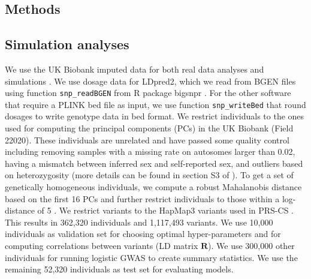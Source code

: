 \documentclass{bioinfo}
\begin{document}


\begin{methods}
\section{Methods}

\subsection*{Simulation analyses}

We use the UK Biobank imputed data for both real data analyses and simulations \cite[]{bycroft2018uk}. 
We use dosage data for LDpred2, which we read from BGEN files using function \texttt{snp\_readBGEN} from R package bigsnpr \cite[]{prive2017efficient}.
For the other software that require a PLINK bed file as input, we use function \texttt{snp\_writeBed} that round dosages to write genotype data in bed format.
We restrict individuals to the ones used for computing the principal components (PCs) in the UK Biobank (Field 22020). These individuals are unrelated and have passed some quality control including removing samples with a missing rate on autosomes larger than 0.02, having a mismatch between inferred sex and self-reported sex, and outliers based on heterozygosity (more details can be found in section S3 of \cite{bycroft2018uk}).
To get a set of genetically homogeneous individuals, we compute a robust Mahalanobis distance based on the first 16 PCs and further restrict individuals to those within a log-distance of 5 \cite[]{prive2020efficient}.
We restrict variants to the HapMap3 variants used in PRS-CS \cite[]{ge2019polygenic}.
This results in 362,320 individuals and 1,117,493 variants.
We use 10,000 individuals as validation set for choosing optimal hyper-parameters and for computing correlations between variants (LD matrix $\boldsymbol{R}$). 
We use 300,000 other individuals for running logistic GWAS to create summary statistics.
We use the remaining 52,320 individuals as test set for evaluating models.


\end{methods}
\end{document}
